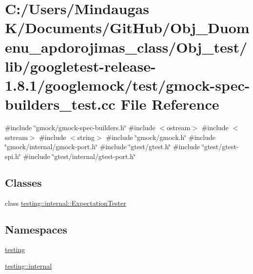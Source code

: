 \hypertarget{_obj__test_2lib_2googletest-release-1_88_81_2googlemock_2test_2gmock-spec-builders__test_8cc}{}\section{C\+:/\+Users/\+Mindaugas K/\+Documents/\+Git\+Hub/\+Obj\+\_\+\+Duomenu\+\_\+apdorojimas\+\_\+class/\+Obj\+\_\+test/lib/googletest-\/release-\/1.8.1/googlemock/test/gmock-\/spec-\/builders\+\_\+test.cc File Reference}
\label{_obj__test_2lib_2googletest-release-1_88_81_2googlemock_2test_2gmock-spec-builders__test_8cc}
{\ttfamily \#include \char`\"{}gmock/gmock-\/spec-\/builders.\+h\char`\"{}}\newline
{\ttfamily \#include $<$ostream$>$}\newline
{\ttfamily \#include $<$sstream$>$}\newline
{\ttfamily \#include $<$string$>$}\newline
{\ttfamily \#include \char`\"{}gmock/gmock.\+h\char`\"{}}\newline
{\ttfamily \#include \char`\"{}gmock/internal/gmock-\/port.\+h\char`\"{}}\newline
{\ttfamily \#include \char`\"{}gtest/gtest.\+h\char`\"{}}\newline
{\ttfamily \#include \char`\"{}gtest/gtest-\/spi.\+h\char`\"{}}\newline
{\ttfamily \#include \char`\"{}gtest/internal/gtest-\/port.\+h\char`\"{}}\newline
\subsection*{Classes}
\begin{DoxyCompactItemize}
\item 
class \mbox{\hyperlink{classtesting_1_1internal_1_1_expectation_tester}{testing\+::internal\+::\+Expectation\+Tester}}
\end{DoxyCompactItemize}
\subsection*{Namespaces}
\begin{DoxyCompactItemize}
\item 
 \mbox{\hyperlink{namespacetesting}{testing}}
\item 
 \mbox{\hyperlink{namespacetesting_1_1internal}{testing\+::internal}}
\end{DoxyCompactItemize}
